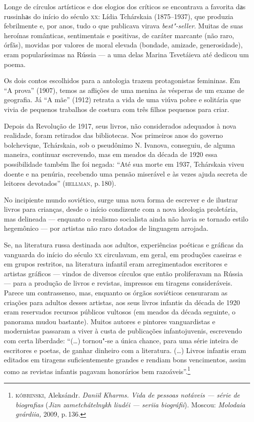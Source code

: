 Longe de círculos artísticos e dos elogios dos críticos se encontrava a
favorita dаs russinhаs do início do século \textsc{xx}: Lídia Tchárskaia
(1875--1937), que produzia febrilmente e, por anos, tudo o que
publicava virava \emph{best"-seller}. Muitas de suas heroínas românticas,
sentimentais e positivas, de caráter marcante (não raro, órfãs), movidas
por valores de moral elevada (bondade, amizade, generosidade), eram
popularíssimas na Rússia --- a uma delas Marina Tsvetáieva até dedicou um
poema.

Os dois contos escolhidos para a antologia trazem protagonistas
femininas. Em ``A prova'' (1907), temos as aflições de uma menina
às vésperas de um exame de geografia. Já ``A mãe'' (1912) retrata
a vida de uma viúva pobre e solitária que vivia de pequenos trabalhos de
costura com três filhos pequenos para criar.

Depois da Revolução de 1917, seus livros, não considerados adequados à
nova realidade, foram retirados das bibliotecas. Nos primeiros anos do
governo bolchevique, Tchárskaia, sob o pseudônimo N. Ivanova,
conseguiu, de alguma maneira, continuar escrevendo, mas em meados da
década de 1920 essa possibilidade também lhe foi negada: ``Até sua morte
em 1937, Tchárskaia viveu doente e na penúria, recebendo uma pensão
miserável e às vezes ajuda secreta de leitores devotados'' (\textsc{hellman}, p.\,180).

No incipiente mundo soviético, surge uma nova forma de escrever e de
ilustrar livros para crianças, desde o início condizente com a nova
ideologia proletária, mas delineada --- enquanto o realismo socialista
ainda não havia se tornado estilo hegemônico --- por artistas não raro
dotados de linguagem arrojada.

Se, na literatura russa destinada aos adultos, experiências poéticas e
gráficas da vanguarda do início do século \textsc{xx} circulavam, em geral, em
produções caseiras e em grupos restritos, na literatura infantil eram
arregimentados escritores e artistas gráficos --- vindos de diversos
círculos que então proliferavam na Rússia --- para a produção de livros
e revistas, impressos em tiragens consideráveis. Parece um contrassenso,
mas, enquanto os órgãos soviéticos censuraram as criações para adultos
desses artistas, aos seus livros infantis da década de 1920 eram
reservados recursos públicos vultosos (em meados da década seguinte, o
panorama mudou bastante). Muitos autores e pintores vanguardistas e
modernistas passaram a viver à custa de publicações infantojuvenis,
escrevendo com certa liberdade: ``(\ldots) tornou"-se a única chance, para
uma série inteira de escritores e poetas, de ganhar dinheiro com a
literatura. (\ldots) Livros infantis eram editados em tiragens
suficientemente grandes e rendiam bons vencimentos, assim como as
revistas infantis pagavam honorários bem razoáveis''.\footnote{\textsc{kóbrinski},
  Aleksándr. \emph{Daniil Kharms. Vida de pessoas notáveis --- série de
  biografias} (\emph{Jizn zametchátelnykh liudéi --- seriia
  biográfii}). Moscou: \emph{Molodaia gvárdiia,} 2009, p.\,136.}

